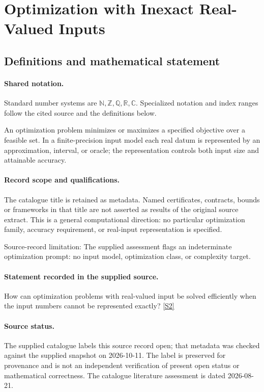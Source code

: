 \documentclass[11pt]{article}
\newcommand{\sref}[2]{\hyperlink{source:#1:#2}{[S#2]}}
\begin{document}
\section{Optimization with Inexact Real-Valued Inputs}\label{statement}

\subsection{Definitions and mathematical statement}

\paragraph{Shared notation.}Standard number systems are $\mathbb N,\mathbb Z,\mathbb Q,\mathbb R,\mathbb C$. Specialized notation and index ranges follow the cited source and the definitions below.


An optimization problem minimizes or maximizes a specified objective over a feasible set. In a finite-precision input model each real datum is represented by an approximation, interval, or oracle; the representation controls both input size and attainable accuracy.
\paragraph{Record scope and qualifications.}
The catalogue title is retained as metadata. Named certificates, contracts, bounds or frameworks in that title are not asserted as results of the original source extract.
This is a general computational direction: no particular optimization family, accuracy requirement, or real-input representation is specified.

Source-record limitation: The supplied assessment flags an indeterminate optimization prompt: no input model, optimization class, or complexity target.
\paragraph{Statement recorded in the supplied source.}
How can optimization problems with real-valued input be solved efficiently when the input numbers cannot be represented exactly? \sref{statement}{2}
\paragraph{Source status.}
The supplied catalogue labels this source record open; that metadata was checked against the supplied snapshot on 2026-10-11. The label is preserved for provenance and is not an independent verification of present open status or mathematical correctness. The catalogue literature assessment is dated 2026-08-21.
\end{document}
